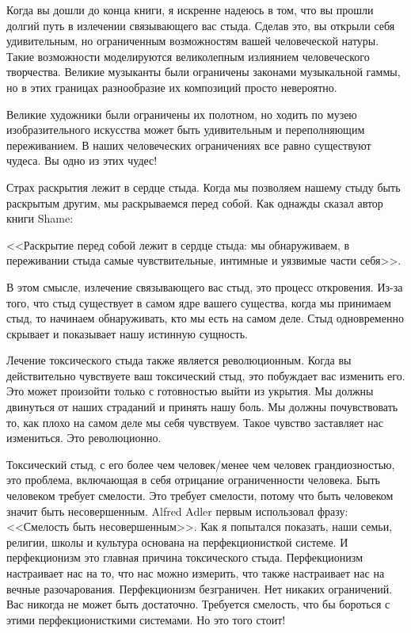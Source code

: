 \documentclass[10pt, fleqn]{article}
\begin{document}
Когда вы дошли до конца книги, я искренне надеюсь в том, что вы прошли долгий путь в излечении связывающего вас стыда. Сделав это, вы открыли себя удивительным, но ограниченным возможностям вашей человеческой натуры. Такие возможности моделируются великолепным излиянием человеческого творчества. Великие музыканты были ограничены законами музыкальной гаммы, но в этих границах разнообразие их композиций просто невероятно.

Великие художники были ограничены их полотном, но ходить по музею изобразительного искусства может быть удивительным и переполняющим переживанием. В наших человеческих ограничениях все равно существуют чудеса. Вы одно из этих чудес!



Страх раскрытия лежит в сердце стыда. Когда мы позволяем нашему стыду быть раскрытым другим, мы раскрываемся перед собой. Как однажды сказал автор книги Shame:

<<Раскрытие перед собой лежит в сердце стыда: мы обнаруживаем, в переживании стыда самые чувствительные, интимные и уязвимые части себя>>.

В этом смысле, излечение связывающего вас стыд, это процесс откровения. Из-за того, что стыд существует в самом ядре вашего существа, когда мы принимаем стыд, то начинаем обнаруживать, кто мы есть на самом деле. Стыд одновременно скрывает и показывает нашу истинную сущность.

Лечение токсического стыда также является революционным. Когда вы действительно чувствуете ваш токсический стыд, это побуждает вас изменить его. Это может произойти только с готовностью выйти из укрытия. Мы должны двинуться от наших страданий и принять нашу боль. Мы должны почувствовать то, как плохо на самом деле мы себя чувствуем. Такое чувство заставляет нас измениться. Это революционно.

Токсический стыд, с его более чем человек/менее чем человек грандиозностью, это проблема, включающая в себя отрицание ограниченности человека. Быть человеком требует смелости. Это требует смелости, потому что быть человеком значит быть несовершенным. Alfred Adler первым использовал фразу: <<Смелость быть несовершенным>>. Как я попытался показать, наши семьи, религии, школы и культура основана на перфекционисткой системе. И перфекционизм это главная причина токсического стыда. Перфекционизм настраивает нас на то, что нас можно измерить, что также настраивает нас на вечные разочарования. Перфекционизм безграничен. Нет никаких ограничений. Вас никогда не может быть достаточно. Требуется смелость, что бы бороться с этими перфекционисткими системами. Но это того стоит!
\end{document}
